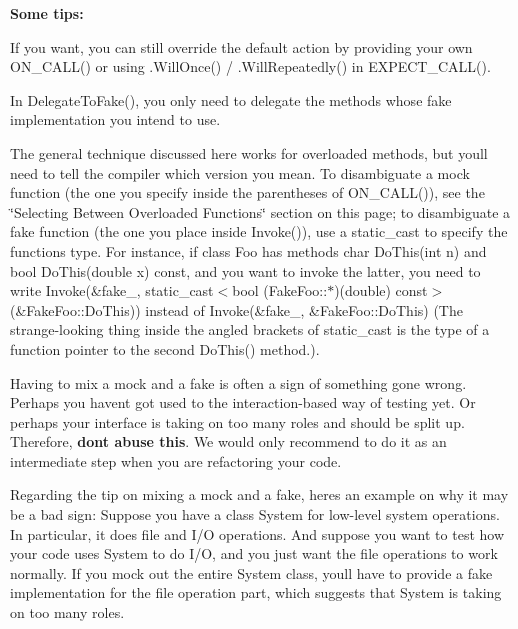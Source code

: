 {\bfseries Some tips\+:}


\begin{DoxyItemize}
\item If you want, you can still override the default action by providing your own {\ttfamily O\+N\+\_\+\+C\+A\+L\+L()} or using {\ttfamily .Will\+Once()} / {\ttfamily .Will\+Repeatedly()} in {\ttfamily E\+X\+P\+E\+C\+T\+\_\+\+C\+A\+L\+L()}.
\item In {\ttfamily Delegate\+To\+Fake()}, you only need to delegate the methods whose fake implementation you intend to use.
\item The general technique discussed here works for overloaded methods, but you\textquotesingle{}ll need to tell the compiler which version you mean. To disambiguate a mock function (the one you specify inside the parentheses of {\ttfamily O\+N\+\_\+\+C\+A\+L\+L()}), see the \char`\"{}\+Selecting Between Overloaded Functions\char`\"{} section on this page; to disambiguate a fake function (the one you place inside {\ttfamily Invoke()}), use a {\ttfamily static\+\_\+cast} to specify the function\textquotesingle{}s type. For instance, if class {\ttfamily Foo} has methods {\ttfamily char Do\+This(int n)} and {\ttfamily bool Do\+This(double x) const}, and you want to invoke the latter, you need to write {\ttfamily Invoke(\&fake\+\_\+, static\+\_\+cast$<$bool (Fake\+Foo\+:\+:$\ast$)(double) const$>$(\&Fake\+Foo\+::\+Do\+This))} instead of {\ttfamily Invoke(\&fake\+\_\+, \&\+Fake\+Foo\+::\+Do\+This)} (The strange-\/looking thing inside the angled brackets of {\ttfamily static\+\_\+cast} is the type of a function pointer to the second {\ttfamily Do\+This()} method.).
\item Having to mix a mock and a fake is often a sign of something gone wrong. Perhaps you haven\textquotesingle{}t got used to the interaction-\/based way of testing yet. Or perhaps your interface is taking on too many roles and should be split up. Therefore, {\bfseries don\textquotesingle{}t abuse this}. We would only recommend to do it as an intermediate step when you are refactoring your code.
\end{DoxyItemize}

Regarding the tip on mixing a mock and a fake, here\textquotesingle{}s an example on why it may be a bad sign\+: Suppose you have a class {\ttfamily System} for low-\/level system operations. In particular, it does file and I/O operations. And suppose you want to test how your code uses {\ttfamily System} to do I/O, and you just want the file operations to work normally. If you mock out the entire {\ttfamily System} class, you\textquotesingle{}ll have to provide a fake implementation for the file operation part, which suggests that {\ttfamily System} is taking on too many roles.


